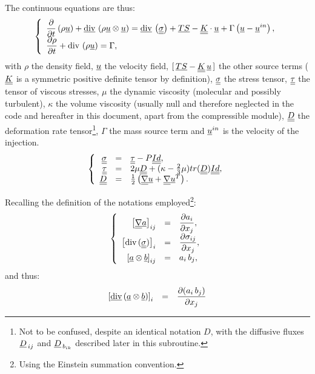 The continuous equations are thus:
\begin{equation}
  \label{eq:continuousnavstv}
\left\{
\begin{array}{l}
\displaystyle \dfrac{\partial }{\partial t} \left( \rho \underline{u} \right) + \underline{\text{div}}\, \left( \rho  \underline{u} \otimes \underline{u} \right)
=\underline{\text{div}}\, \left( \underline{\underline{\sigma}} \right) + \underline{TS} - \underline{\underline{K}} \cdot \underline{u} + \Gamma \left( \underline{u} - \underline{u}^{in}\right),\\
\dfrac{\partial \rho}{\partial t} + \text{div}\, \left( \rho \underline{u} \right) = \Gamma ,
\end{array}\right.
\end{equation}
%
with $\rho$ the density field, $\underline{u}$ the velocity field,
$[\,\underline{TS}-\underline{\underline{K}}\,\underline{u}\,]$ the other source terms ($\underline{\underline{K}}$ is a
symmetric positive definite tensor by definition), $\underline{\underline{\sigma}}$ the stress tensor,
$\underline{\underline{\tau}}$ the tensor of viscous stresses,
$\mu$ the dynamic viscosity (molecular and possibly turbulent),
$\kappa$ the volume viscosity (usually null and therefore neglected in
the code and hereafter in this document, apart from the compressible module),
$\underline{\underline{D}}$ the deformation rate tensor\footnote{Not to be confused,
despite an identical notation $D$, with the diffusive fluxes
$\underline{D}_{\,ij}$ and $\underline{D}_{\,{b}_{ik}}$ described later in this
subroutine.}, $\Gamma$ the mass source term and $\underline{u}^{in}$ is the velocity of the injection.
\begin{equation}
\left\{
\begin{array}{r c l}
\underline{\underline{\sigma}} & = & \underline{\underline{\tau}} - P\underline{\underline{Id}} ,  \\
\underline{\underline{\tau}} & = & 2 \mu  \underline{\underline{D}} +  (\kappa  - \frac{2}{3}\mu) tr({\underline{\underline{D}}})
\underline{\underline{Id}} , \\
\underline{\underline{D}} &=& \frac{1}{2}\left( \underline{\underline{\nabla}}\underline{u}+ \underline{\underline{\nabla}}\underline{u}^T \right).
\end{array}\right.
\end{equation}

Recalling the definition of the notations employed\footnote{Using the
Einstein summation convention.}:
\begin{equation}\notag
\left\{\begin{array}{r c l}
\left[\underline{\underline{\nabla}}{\underline{a}}\right]_{ij} &=& \dfrac{\partial a_i}{\partial x_j},\\
\left[\text{div}\,(\underline{\underline{\sigma}})\right]_i &=& \dfrac{\partial \sigma_{ij}}{\partial x_j},\\
\left[\underline{a}\otimes\underline{b}\right]_{ij} &= &
a_i\,b_j,\\
\end{array}\right.
\end{equation}
and thus:
\begin{equation}\notag
\begin{array}{lll}
\left[\underline{\text{div}}\,(\underline{a}\otimes\underline{b})\right]_i &= &
\dfrac{\partial (a_i\,b_j)}{\partial x_j}
\end{array}
\end{equation}

